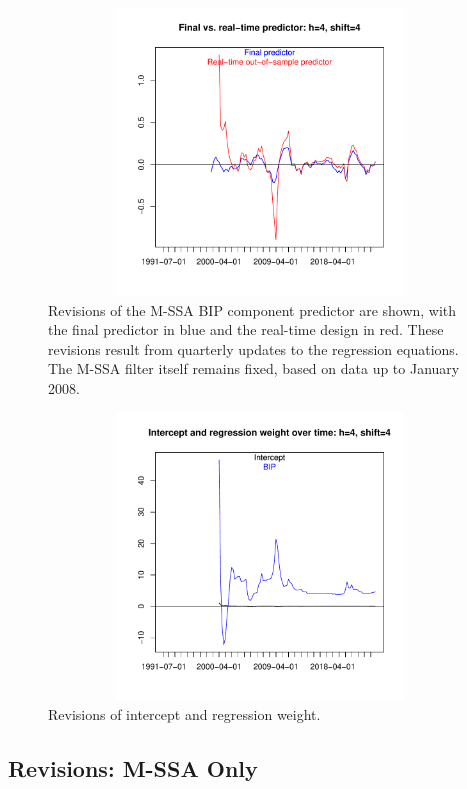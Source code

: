 \documentclass[a4paper]{article}
\begin{document}
\begin{figure}[H]\begin{center}\includegraphics[height=3in, width=4.5in]{./Figures/revisions1.pdf}\caption{Revisions of the M-SSA BIP component predictor are shown, with the final predictor in blue and the real-time design in red. These revisions result from quarterly updates to the regression equations. The M-SSA filter itself remains fixed, based on data up to January 2008.\label{revisions1}}\end{center}\end{figure}\begin{figure}[H]\begin{center}\includegraphics[height=3in, width=4.5in]{./Figures/revisions2.pdf}\caption{Revisions of intercept and regression weight.\label{revisions2}}\end{center}\end{figure}

\subsection{Revisions: M-SSA Only}
\end{document}
